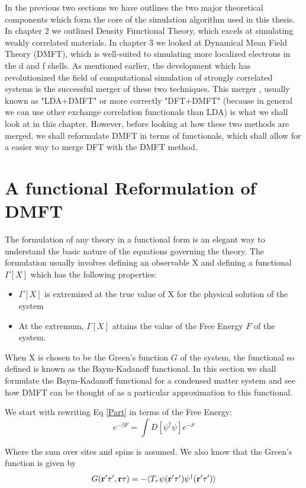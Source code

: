 \documentclass[10pt]{ruthesis}
\begin{document}
In the previous two sections we have outlines the two major theoretical components which form the core of the simulation algorithm used in this thesis. In chapter 2 we outlined Density Functional Theory, which excels at simulating weakly correlated materials. In chapter 3 we looked at Dynamical Mean Field Theory (DMFT), which is well-suited to simulating more localized electrons in the d and f shells. As mentioned earlier, the development which has revolutionized the field of computational simulation of strongly correlated systems is the successful merger of these two techniques. This merger , usually known as "LDA+DMFT" or more correctly "DFT+DMFT" (because in general we can use other exchange correlation functionals than LDA) is what we shall look at in this chapter. However, before looking at how these two methods are merged, we shall reformulate DMFT in terms of functionals, which shall allow for a easier way to merge DFT with the DMFT method.

\section{A functional Reformulation of DMFT}

The formulation of any theory in a functional form is an elegant way to understand the basic nature of the equations governing the theory. The formulation usually involves defining an observable X and defining a functional $\Gamma[X]$ which has the following properties:
\begin{itemize}
\item $\Gamma[X]$ is extremized at the true value of X for the physical solution of the system
\item At the extremum, $\Gamma[X]$ attains the value of the Free Energy $F$ of the system.
\end{itemize}
 When X is chosen to be the Green's function $G$ of the system, the functional so defined is known as the Baym-Kadanoff functional. In this section we shall formulate the Baym-Kadanoff functional for a condensed matter system and see how DMFT can be thought of as a particular approximation to this functional.
 
We start with rewriting Eq \ref{Part} in terms of the Free Energy:
\begin{equation}
 e^{-\beta F}=\int  D [\psi^\dagger \psi] e^{-S}
\end{equation}

Where the sum over sites and spins is assumed. We also know that the Green's function is given by 
\begin{equation}
G(\mathbf{r}' \tau', \mathbf{r} \tau) = -\langle T_{\tau} \psi(\mathbf{r}' \tau') \psi ^\dagger (\mathbf{r}' \tau') \rangle 
\end{equation}
\end{document}
